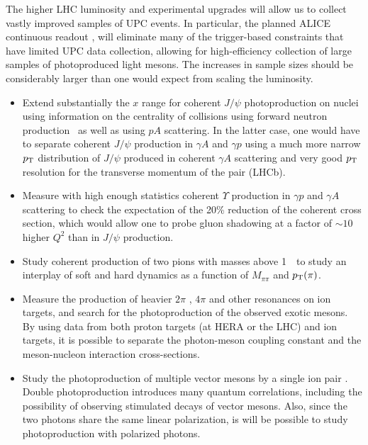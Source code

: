 \documentclass[../report.tex]{subfiles}
\begin{document}
The higher LHC luminosity and experimental upgrades will allow us to collect vastly improved samples of UPC events.   In particular, the planned ALICE continuous readout \cite{Krivda:2017sto}, will eliminate many of the trigger-based constraints that have limited UPC data collection, allowing for high-efficiency collection of large samples of photoproduced light mesons.   The increases in sample sizes should be considerably larger than one would expect from scaling the luminosity.  
\begin{itemize}
\item
Extend substantially the $x$ range for coherent $J/\psi$ photoproduction on nuclei
using information on the centrality of collisions using forward neutron production~\cite{Guzey:2013jaa}
 as well as using $pA$ scattering. In the latter case, one would have to separate coherent $J/\psi$ production in $\gamma A$ and $\gamma p$  using a much more narrow $p\sb{\scriptstyle\mathrm{T}}$ distribution of $J/\psi $ produced in coherent $\gamma A$ scattering
 and very good $p\sb{\scriptstyle\mathrm{T}}$ resolution for the transverse momentum of the pair (LHCb).
\item
Measure with high enough  statistics coherent $\Upsilon $ production in $\gamma p$ and $\gamma A$
scattering to check the expectation of the 20\% reduction of the coherent cross section, which would allow one to probe gluon shadowing at a factor of $\sim 10 $ higher $Q^2$ than in $J/\psi$ production.
\item
Study coherent production of two pions with masses above 1~\UGeVcc\ to study an interplay of soft and hard dynamics as a function of $M_{\pi \pi}$ and $p\sb{\scriptstyle\mathrm{T}}(\pi)$.   
\item
Measure the production of heavier $2\pi$ \cite{Klein:2016dtn}, $4\pi$ and other resonances on ion targets, and search for the photoproduction of the observed exotic mesons.  
By using data from both proton targets (at HERA or the LHC) and ion targets, it is possible to separate the photon-meson coupling constant and the meson-nucleon interaction cross-sections.  
\item
Study the photoproduction of multiple vector mesons by a single ion pair \cite{Klein:1999qj}.   Double photoproduction introduces many quantum correlations, including the possibility of observing stimulated decays of vector mesons.  Also, since the two photons share the same linear polarization, is will be possible to study photoproduction with polarized photons.

\end{itemize}
\end{document}
